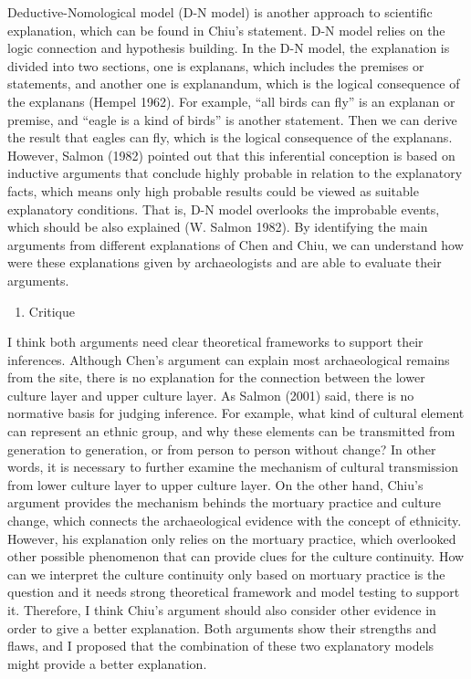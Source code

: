 \documentclass[10pt]{article}
\begin{document}
Deductive-Nomological model (D-N model) is another approach to
scientific explanation, which can be found in Chiu's statement. D-N
model relies on the logic connection and hypothesis building. In the D-N
model, the explanation is divided into two sections, one is explanans,
which includes the premises or statements, and another one is
explanandum, which is the logical consequence of the explanans (Hempel
1962). For example, ``all birds can fly'' is an explanan or premise, and
``eagle is a kind of birds'' is another statement. Then we can derive
the result that eagles can fly, which is the logical consequence of the
explanans. However, Salmon (1982) pointed out that this inferential
conception is based on inductive arguments that conclude highly probable
in relation to the explanatory facts, which means only high probable
results could be viewed as suitable explanatory conditions. That is, D-N
model overlooks the improbable events, which should be also explained
(W. Salmon 1982). By identifying the main arguments from different
explanations of Chen and Chiu, we can understand how were these
explanations given by archaeologists and are able to evaluate their
arguments.

\begin{enumerate}
\def\labelenumi{\arabic{enumi}.}
\setcounter{enumi}{2}
\itemsep1pt\parskip0pt
\item
  Critique
\end{enumerate}

I think both arguments need clear theoretical frameworks to support
their inferences. Although Chen's argument can explain most
archaeological remains from the site, there is no explanation for the
connection between the lower culture layer and upper culture layer. As
Salmon (2001) said, there is no normative basis for judging inference.
For example, what kind of cultural element can represent an ethnic
group, and why these elements can be transmitted from generation to
generation, or from person to person without change? In other words, it
is necessary to further examine the mechanism of cultural transmission
from lower culture layer to upper culture layer. On the other hand,
Chiu's argument provides the mechanism behinds the mortuary practice and
culture change, which connects the archaeological evidence with the
concept of ethnicity. However, his explanation only relies on the
mortuary practice, which overlooked other possible phenomenon that can
provide clues for the culture continuity. How can we interpret the
culture continuity only based on mortuary practice is the question and
it needs strong theoretical framework and model testing to support it.
Therefore, I think Chiu's argument should also consider other evidence
in order to give a better explanation. Both arguments show their
strengths and flaws, and I proposed that the combination of these two
explanatory models might provide a better explanation.
\end{document}
